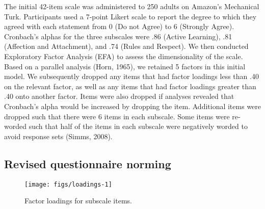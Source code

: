 \documentclass[10pt, letterpaper]{article}
\newenvironment{CodeChunk}{}{}
\begin{document}
The initial 42-item scale was administered to 250 adults on Amazon's
Mechanical Turk. Participants used a 7-point Likert scale to report the
degree to which they agreed with each statement from 0 (Do not Agree) to
6 (Strongly Agree). Cronbach's alphas for the three subscales were .86
(Active Learning), .81 (Affection and Attachment), and .74 (Rules and
Respect). We then conducted Exploratory Factor Analysis (EFA) to assess
the dimensionality of the scale. Based on a parallel analysis (Horn,
1965), we retained 5 factors in this initial model. We subsequently
dropped any items that had factor loadings less than .40 on the relevant
factor, as well as any items that had factor loadings greater than .40
onto another factor. Items were also dropped if analyses revealed that
Cronbach's alpha would be increased by dropping the item. Additional
items were dropped such that there were 6 items in each subscale. Some
items were re-worded such that half of the items in each subscale were
negatively worded to avoid response sets (Simms, 2008).

\subsection{Revised questionnaire
norming}\label{revised-questionnaire-norming}

\begin{CodeChunk}
\begin{figure*}[h]

{\centering \texttt{[image: figs/loadings-1]} 

}

\caption[Factor loadings for subscale items]{Factor loadings for subscale items.}\label{fig:loadings}
\end{figure*}
\end{CodeChunk}
\end{document}
